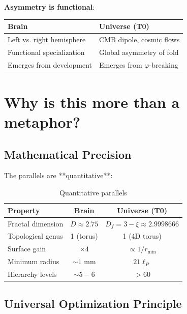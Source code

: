 	\begin{keyresult}
		\textbf{Asymmetry is functional}:
		
		\vspace{0.3cm}
		
		\begin{center}
			\begin{tabular}{p{4cm}|p{4cm}}
				\toprule
				\textbf{Brain} & \textbf{Universe (T0)} \\
				\midrule
				Left vs. right hemisphere & CMB dipole, cosmic flows \\
				Functional specialization & Global asymmetry of fold \\
				Emerges from development & Emerges from $\varphi$-breaking \\
				\bottomrule
			\end{tabular}
		\end{center}
	\end{keyresult}
	
	\section{Why is this more than a metaphor?}
	
	\subsection{Mathematical Precision}
	
	The parallels are **quantitative**:
	
	\begin{table}[H]
		\centering
		\small
		\begin{tabular}{lcc}
			\toprule
			\textbf{Property} & \textbf{Brain} & \textbf{Universe (T0)} \\
			\midrule
			Fractal dimension & $D \approx 2.75$ & $D_f = 3-\xi \approx 2.9998666$ \\
			Topological genus & 1 (torus) & 1 (4D torus) \\
			Surface gain & $\times 4$ & $\propto 1/r_{\min}$ \\
			Minimum radius & $\sim 1$ mm & $21 \ell_P$ \\
			Hierarchy levels & $\sim 5-6$ & $>60$ \\
			\bottomrule
		\end{tabular}
		\caption{Quantitative parallels}
	\end{table}
	
	\subsection{Universal Optimization Principle}
	
